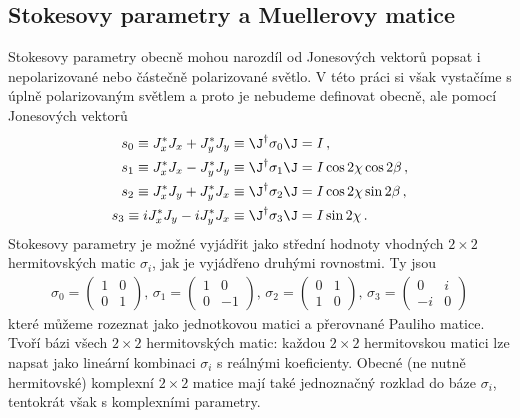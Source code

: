 \subsection{Stokesovy parametry a Muellerovy matice \cite{JonesMueller}} \label{k:stokes}
Stokesovy parametry obecně mohou narozdíl od Jonesových vektorů popsat i nepolarizované nebo částečně polarizované světlo.
V této práci si však vystačíme s úplně polarizovaným světlem a proto je nebudeme definovat obecně, ale pomocí Jonesových vektorů
\begin{align}
s_0 \equiv J_x^* J_x+J_y^* J_y\equiv \J^\dagger \sigma_0 \J &= I \,,\\
s_1 \equiv J_x^* J_x-J_y^* J_y\equiv \J^\dagger \sigma_1 \J &= I \cos 2\chi \cos 2\beta \,,  \\
s_2 \equiv J_x^* J_y+J_y^* J_x\equiv \J^\dagger \sigma_2 \J &= I \cos 2\chi \sin 2\beta \,, \\
s_3 \equiv i J_x^* J_y-i J_y^* J_x  \equiv \J^\dagger \sigma_3 \J &= I \sin 2\chi \,.
\end{align}
Stokesovy parametry je možné vyjádřit jako střední hodnoty vhodných $2\times 2$ hermitovských matic $\sigma_{i}$, jak je vyjádřeno druhými rovnostmi. Ty jsou
\begin{align}
\sigma_0=\begin{pmatrix} 1 & 0 \\ 0 & 1 \end{pmatrix} ,\,
\sigma_1=\begin{pmatrix} 1 & 0 \\ 0 & -1 \end{pmatrix} ,\,
\sigma_2=\begin{pmatrix} 0 & 1 \\ 1 & 0 \end{pmatrix} ,\,
\sigma_3=\begin{pmatrix} 0 & i \\ -i & 0 \end{pmatrix}
\end{align}
které můžeme rozeznat jako jednotkovou matici a přerovnané Pauliho matice.
Tvoří bázi všech $2\times 2$ hermitovských matic: každou $2\times 2$ hermitovskou matici lze napsat jako lineární kombinaci $\sigma_i$ s reálnými koeficienty.
Obecné (ne nutně hermitovské) komplexní $2\times 2$ matice mají také jednoznačný rozklad do báze $\sigma_i$, tentokrát však s komplexními parametry.

